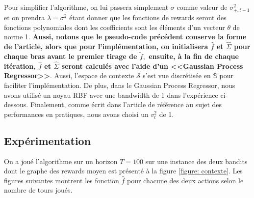 \documentclass[letterpaper,11pt]{article}
\begin{document}
Pour simplifier l'algorithme, on lui passera simplement $\sigma$ comme valeur de $\sigma^2_{+,t-1}$ et on prendra $\lambda=\sigma^2$ étant donner que les fonctions de rewards seront des fonctions polynomiales dont les coefficients sont les éléments d'un vecteur $\theta$ de norme 1. \textbf{Aussi, notons que le pseudo-code précédent conserve la forme de l'article, alors que pour l'implémentation, on initialisera $\widehat{f}$ et $\widehat{\Sigma}$ pour chaque bras avant le premier tirage de $\tilde{f},$ ensuite, à la fin de chaque itération, $\widehat{f}$ et $\widehat{\Sigma}$ seront calculés avec l'aide d'un <<Gaussian Process Regressor>>}. Aussi, l'espace de contexte $\mathcal{S}$ s'est vue discrétisée en $\mathbb{S}$ pour faciliter l'implémentation. De plus, dans le Gaussian Process Regressor, nous avons utilisé un noyau RBF avec une bandwidth de 1 dans l'expérience ci-dessous. Finalement, comme écrit dans l'article de référence au sujet des performances en pratiques, nous avons choisi un $v_t^2$ de 1. 

\subsection{Expérimentation}

On a joué l'algorithme sur un horizon $T=100$ sur une instance des deux bandits dont le graphe des rewards moyen est présenté à la figure \ref{figure: contexte}. Les figures suivantes montrent les fonction $\widehat{f}$ pour chacune des deux actions selon le nombre de tours joués.
\end{document}
